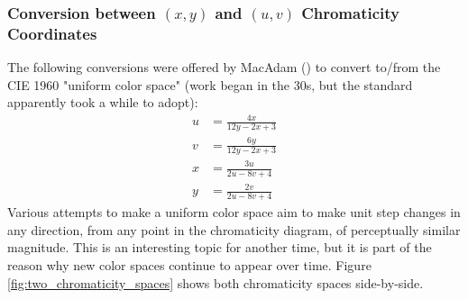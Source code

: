 \documentclass[twocolumn]{article}
\newif\ifinvert
\begin{document}
\subsubsection{Conversion between $(x,y)$ and $(u,v)$ Chromaticity Coordinates}
The following conversions were offered by MacAdam (\cite{macadam1937projective}) to convert to/from the CIE 1960 "uniform color space" (work began in the 30s, but the standard apparently took a while to adopt):
\begin{equation}
    \begin{aligned}
        u&=\frac{4x}{12y-2x+3}\\
        v&=\frac{6y}{12y-2x+3}\\
        x&=\frac{3u}{2u-8v+4}\\
        y&=\frac{2v}{2u-8v+4}
    \end{aligned}
\end{equation}
Various attempts to make a uniform color space aim to make unit step changes in any direction, from any point in the chromaticity diagram, of perceptually similar magnitude.  This is an interesting topic for another time, but it is part of the reason why new color spaces continue to appear over time.  Figure \ref{fig:two_chromaticity_spaces} shows both chromaticity spaces side-by-side.
\begin{figure*}[h]
    \ifinvert
        
    \else
        
    \fi
    \caption{CIE 1931 $(x,y)$ (left) and CIE 1960 $(u,v)$ (right) chromaticity diagrams.  The sRGB color gamut triangle is present in both diagrams along with the Planckian locus.  IMAGE LINK, CODE LINK}\label{fig:two_chromaticity_spaces}
\end{figure*}
\twocolumn[{\printbibliography}]
\end{document}
